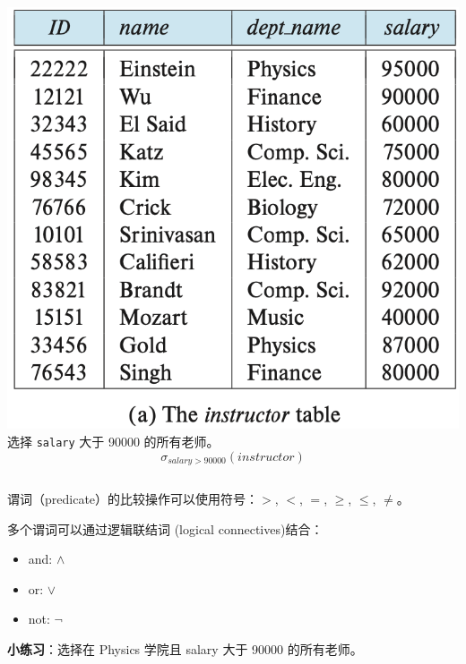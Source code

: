 \documentclass[aspectratio=169, 14pt]{beamer}
\begin{document}
\begin{frame}

    \begin{columns}
        \includegraphics[width=\textwidth]{table/instructor}
        \alert{选择} \texttt{salary} 大于 90000 的所有老师。
        \large{\[\sigma_{salary >  90000}(instructor)\]}
    \end{columns} 

\end{frame}

\begin{frame}
谓词（predicate）的比较操作可以使用符号：$>$, $<$, $=$, $\geq$, $\leq$, $\neq$。

多个谓词可以通过\alert{逻辑联结词} (logical connectives)结合：

\begin{itemize}
    \item and: $\land$
    \item or: $\lor$
    \item not: $\neg$
\end{itemize}
    
\pause

\textbf{小练习}：选择在 Physics 学院且 salary 大于 90000 的所有老师。

\end{frame}
\end{document}
